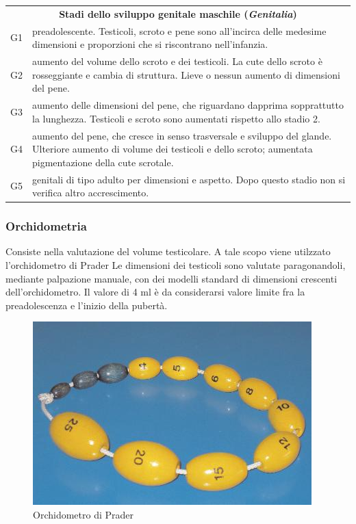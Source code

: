 \begin{table}[!h]
\begin{tabular}{lp{13.3cm}}
\midrule
\multicolumn{2}{c}{\textbf{Stadi dello sviluppo genitale maschile (\emph{Genitalia})}}\\
G1 &	preadolescente. Testicoli, scroto e pene sono all'incirca delle medesime dimensioni e proporzioni che si riscontrano nell'infanzia.\\
G2 &	aumento del volume dello scroto e dei testicoli. La cute dello scroto è rosseggiante e cambia di struttura. 
		Lieve o nessun aumento di dimensioni del pene.\\
G3 &	aumento delle dimensioni del pene, che riguardano dapprima sopprattutto la lunghezza.
		Testicoli e scroto sono aumentati rispetto allo stadio 2.\\
G4 &	aumento del pene, che cresce in senso trasversale e sviluppo del glande. Ulteriore aumento di volume dei testicoli e dello scroto; 
		aumentata pigmentazione della cute scrotale.\\
G5 &	genitali di tipo adulto per dimensioni e aspetto. Dopo questo stadio non si verifica altro accrescimento.\\
\bottomrule
\end{tabular}
\end{table}


\subsubsection*{Orchidometria}
Consiste nella valutazione del volume testicolare. A tale scopo viene utilzzato l'orchidometro di Prader %
Le dimensioni dei testicoli sono valutate paragonandoli, mediante palpazione manuale, con dei modelli standard di dimensioni crescenti dell'orchidometro. Il valore di 4 ml è da considerarsi valore limite fra la preadolescenza e l'inizio della pubertà.  

\begin{figure}[h]
  \begin{center}
	\includegraphics[scale=0.60]{grafici/orchidometro.jpg}
  \end{center}
  \caption{Orchidometro di Prader}
\end{figure}

